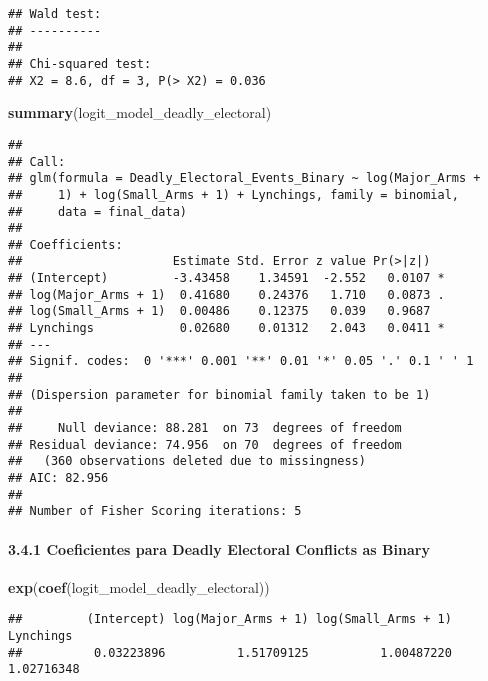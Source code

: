 \documentclass[
  11pt,
]{article}
\newenvironment{Shaded}{\begin{snugshade}}{\end{snugshade}}
\newcommand{\FunctionTok}[1]{\textcolor[rgb]{0.13,0.29,0.53}{\textbf{#1}}}
\newcommand{\NormalTok}[1]{#1}
\begin{document}
\begin{verbatim}
## Wald test:
## ----------
## 
## Chi-squared test:
## X2 = 8.6, df = 3, P(> X2) = 0.036
\end{verbatim}

\begin{Shaded}
\begin{Highlighting}[]
\FunctionTok{summary}\NormalTok{(logit\_model\_deadly\_electoral)}
\end{Highlighting}
\end{Shaded}

\begin{verbatim}
## 
## Call:
## glm(formula = Deadly_Electoral_Events_Binary ~ log(Major_Arms + 
##     1) + log(Small_Arms + 1) + Lynchings, family = binomial, 
##     data = final_data)
## 
## Coefficients:
##                     Estimate Std. Error z value Pr(>|z|)  
## (Intercept)         -3.43458    1.34591  -2.552   0.0107 *
## log(Major_Arms + 1)  0.41680    0.24376   1.710   0.0873 .
## log(Small_Arms + 1)  0.00486    0.12375   0.039   0.9687  
## Lynchings            0.02680    0.01312   2.043   0.0411 *
## ---
## Signif. codes:  0 '***' 0.001 '**' 0.01 '*' 0.05 '.' 0.1 ' ' 1
## 
## (Dispersion parameter for binomial family taken to be 1)
## 
##     Null deviance: 88.281  on 73  degrees of freedom
## Residual deviance: 74.956  on 70  degrees of freedom
##   (360 observations deleted due to missingness)
## AIC: 82.956
## 
## Number of Fisher Scoring iterations: 5
\end{verbatim}

\paragraph{3.4.1 Coeficientes para Deadly Electoral Conflicts as
Binary}\label{coeficientes-para-deadly-electoral-conflicts-as-binary}

\begin{Shaded}
\begin{Highlighting}[]
\FunctionTok{exp}\NormalTok{(}\FunctionTok{coef}\NormalTok{(logit\_model\_deadly\_electoral))}
\end{Highlighting}
\end{Shaded}

\begin{verbatim}
##         (Intercept) log(Major_Arms + 1) log(Small_Arms + 1)           Lynchings 
##          0.03223896          1.51709125          1.00487220          1.02716348
\end{verbatim}
\end{document}
